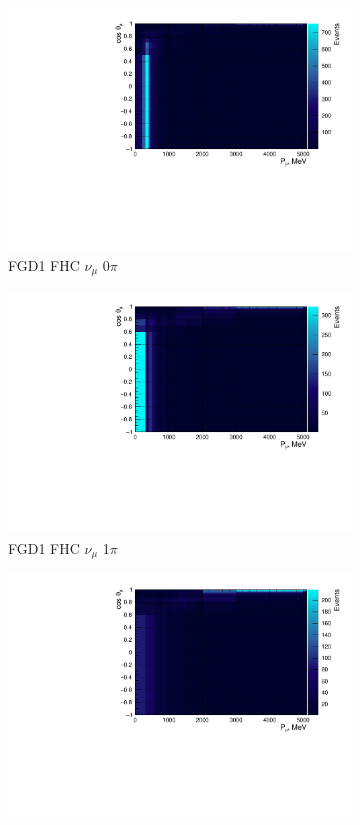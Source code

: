 \begin{figure}
\centering
\begin{subfigure}{.32\textwidth}
  \centering
  \includegraphics[width=0.95\linewidth]{figs/NomMC_MC_FGD1_numuCC_0pi}
  \caption{FGD1 FHC $\nu_{\mu}$ 0$\pi$}
  \label{fig:2d_FGD1_numuCC_0pi}
\end{subfigure}
\begin{subfigure}{.32\textwidth}
  \centering
  \includegraphics[width=0.95\linewidth]{figs/NomMC_MC_FGD1_numuCC_1pi}
  \caption{FGD1 FHC $\nu_{\mu}$ 1$\pi$}
  \label{fig:2d_FGD1_numuCC_1pi}
\end{subfigure}
\begin{subfigure}{.32\textwidth}
  \centering
  \includegraphics[width=0.95\linewidth]{figs/NomMC_MC_FGD1_numuCC_other}

\end{subfigure}
\end{figure}
